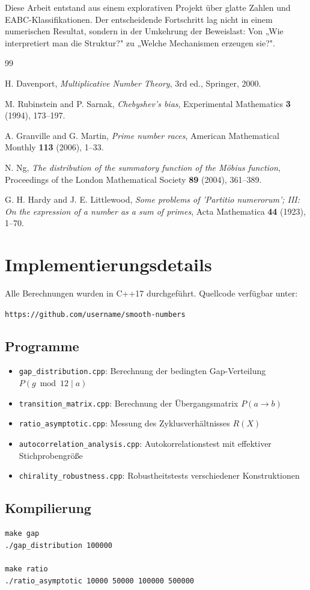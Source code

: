 \documentclass[11pt,a4paper]{article}
\begin{document}
Diese Arbeit entstand aus einem explorativen Projekt über glatte Zahlen und EABC-Klassifikationen. Der entscheidende Fortschritt lag nicht in einem numerischen Resultat, sondern in der Umkehrung der Beweislast: Von „Wie interpretiert man die Struktur?" zu „Welche Mechanismen erzeugen sie?".

\begin{thebibliography}{99}

H. Davenport, \textit{Multiplicative Number Theory}, 3rd ed., Springer, 2000.

M. Rubinstein and P. Sarnak, \textit{Chebyshev's bias}, Experimental Mathematics \textbf{3} (1994), 173--197.

A. Granville and G. Martin, \textit{Prime number races}, American Mathematical Monthly \textbf{113} (2006), 1--33.

N. Ng, \textit{The distribution of the summatory function of the Möbius function}, Proceedings of the London Mathematical Society \textbf{89} (2004), 361--389.

G. H. Hardy and J. E. Littlewood, \textit{Some problems of 'Partitio numerorum'; III: On the expression of a number as a sum of primes}, Acta Mathematica \textbf{44} (1923), 1--70.

\end{thebibliography}

\appendix

\section{Implementierungsdetails}

Alle Berechnungen wurden in C++17 durchgeführt. Quellcode verfügbar unter:

\texttt{https://github.com/username/smooth-numbers}

\subsection{Programme}

\begin{itemize}
\item \texttt{gap\_distribution.cpp}: Berechnung der bedingten Gap-Verteilung $P(g \bmod 12 \mid a)$
\item \texttt{transition\_matrix.cpp}: Berechnung der Übergangsmatrix $P(a \to b)$
\item \texttt{ratio\_asymptotic.cpp}: Messung des Zyklusverhältnisses $R(X)$
\item \texttt{autocorrelation\_analysis.cpp}: Autokorrelationstest mit effektiver Stichprobengröße
\item \texttt{chirality\_robustness.cpp}: Robustheitstests verschiedener Konstruktionen
\end{itemize}

\subsection{Kompilierung}

\begin{verbatim}
make gap
./gap_distribution 100000

make ratio
./ratio_asymptotic 10000 50000 100000 500000
\end{verbatim}
\end{document}
